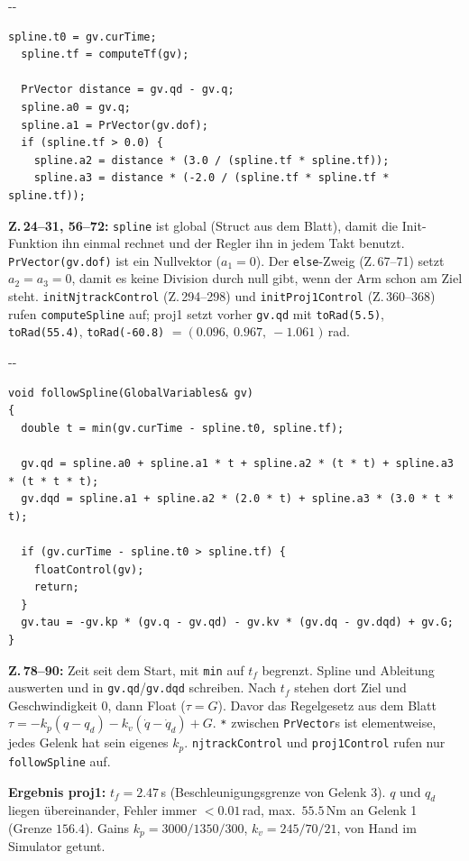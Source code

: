 \documentclass[10pt,a4paper]{article}
\makeatletter
\newcommand{\secneed}[1]{\par\penalty\@M\begingroup\setlength{\dimen@}{#1}\dimen@ii\pagegoal
  \advance\dimen@ii-\pagetotal\ifdim\dimen@>\dimen@ii\ifdim\dimen@ii>\z@\vfil\fi\penalty-\@M\fi\endgroup}
\newcommand{\code}[1]{\texttt{#1}}
\makeatother
\begin{document}
\secneed{10\baselineskip}
\begin{lstlisting}[firstnumber=58]
  spline.t0 = gv.curTime;
  spline.tf = computeTf(gv);

  PrVector distance = gv.qd - gv.q;
  spline.a0 = gv.q;
  spline.a1 = PrVector(gv.dof);
  if (spline.tf > 0.0) {
    spline.a2 = distance * (3.0 / (spline.tf * spline.tf));
    spline.a3 = distance * (-2.0 / (spline.tf * spline.tf * spline.tf));
\end{lstlisting}
\textbf{Z.\,24--31, 56--72:} \code{spline} ist global (Struct aus dem Blatt), damit die Init-Funktion ihn einmal rechnet
und der Regler ihn in jedem Takt benutzt. \code{PrVector(gv.dof)} ist ein Nullvektor ($a_1 = 0$). Der \code{else}-Zweig
(Z.\,67--71) setzt $a_2 = a_3 = 0$, damit es keine Division durch null gibt, wenn der Arm schon am Ziel steht. \code{initNjtrackControl} (Z.\,294--298) und
\code{initProj1Control} (Z.\,360--368) rufen \code{computeSpline} auf; proj1 setzt vorher \code{gv.qd} mit
\code{toRad(5.5)}, \code{toRad(55.4)}, \code{toRad(-60.8)} $= (0.096,\ 0.967,\ -1.061)$\,rad.

\secneed{13\baselineskip}
\begin{lstlisting}[firstnumber=78]
void followSpline(GlobalVariables& gv)
{
  double t = min(gv.curTime - spline.t0, spline.tf);

  gv.qd = spline.a0 + spline.a1 * t + spline.a2 * (t * t) + spline.a3 * (t * t * t);
  gv.dqd = spline.a1 + spline.a2 * (2.0 * t) + spline.a3 * (3.0 * t * t);

  if (gv.curTime - spline.t0 > spline.tf) {
    floatControl(gv);
    return;
  }
  gv.tau = -gv.kp * (gv.q - gv.qd) - gv.kv * (gv.dq - gv.dqd) + gv.G;
}
\end{lstlisting}
\textbf{Z.\,78--90:} Zeit seit dem Start, mit \code{min} auf $t_f$ begrenzt. Spline und Ableitung auswerten und
in \code{gv.qd}/\code{gv.dqd} schreiben. Nach $t_f$ stehen dort Ziel und Geschwindigkeit 0, dann Float ($\tau = G$). Davor das Regelgesetz aus dem Blatt
$\tau = -k_p(q - q_d) - k_v(\dot q - \dot q_d) + G$. \code{*} zwischen \code{PrVector}s ist elementweise, jedes Gelenk hat
sein eigenes $k_p$. \code{njtrackControl} und \code{proj1Control} rufen nur \code{followSpline} auf.

\textbf{Ergebnis proj1:} $t_f = 2.47$\,s (Beschleunigungsgrenze von Gelenk 3). $q$ und $q_d$ liegen übereinander, Fehler
immer $< 0.01$\,rad, max.\ $55.5$\,Nm an Gelenk 1 (Grenze $156.4$). Gains $k_p = 3000/1350/300$, $k_v = 245/70/21$, von Hand
im Simulator getunt.
\end{document}
